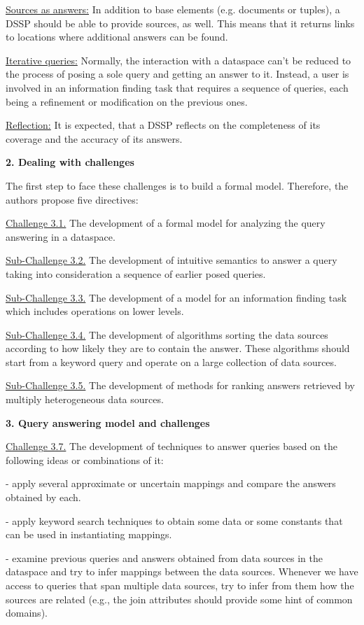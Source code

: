 \uline{Sources as answers:} In addition to base elements (e.g. documents or tuples), a DSSP should be able to provide sources, as well. This means that it returns links to locations where additional answers can be found.

\uline{Iterative queries:} Normally, the interaction with a dataspace can't be reduced to the process of posing  a sole query and getting an answer to it. Instead, a user is involved in an information finding task that requires a sequence of queries, each being a refinement or modification on the previous ones.

\uline{Reflection:} It is expected, that a DSSP reflects on the completeness of its coverage and the accuracy of its answers. 


\textbf{2. Dealing with challenges}

The first step to face these challenges is to build a formal model. Therefore, the authors propose five directives:

\uline{Challenge 3.1.}  The development of a formal model for analyzing the query answering in a dataspace. 

\uline{Sub-Challenge 3.2.} The development of intuitive semantics to answer a query taking into consideration a sequence of earlier posed queries. 

\uline{Sub-Challenge 3.3.} The development of a model for an information finding task which includes operations on lower levels. 

\uline{Sub-Challenge 3.4.} The development of algorithms sorting the data sources according to how likely they are to contain the answer. These algorithms should start from a keyword query and operate on a large collection of data sources.

\uline{Sub-Challenge 3.5.} The development of methods for ranking answers retrieved by multiply heterogeneous data sources.


\textbf{3. Query answering model and challenges}

\uline{Challenge 3.7.} The development of techniques to answer queries based on the following ideas or  
combinations of it:

- apply several approximate or uncertain mappings and compare the answers obtained by each.

- apply keyword search techniques to obtain some data or some constants that can be used in instantiating mappings.

- examine previous queries and answers obtained from data sources in the dataspace and try to infer mappings between the data sources. Whenever we have access to queries that span multiple data sources, try to infer from them how the sources are related (e.g., the join attributes should provide some hint of common domains).

